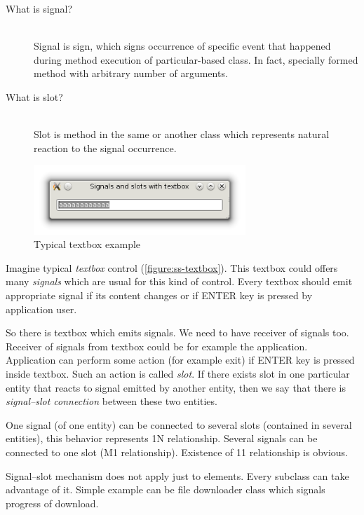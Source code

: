 \begin{description}\label{desc:sig}
\item[What is signal?] \hfill \\
Signal is sign, which signs occurrence of specific event that happened during method execution of particular-based class. In fact, specially formed method with arbitrary number of arguments.
\item[What is slot?] \hfill \\
Slot is method in the same or another class which represents natural reaction to the signal occurrence.
\end{description}

\begin{figure}[ht]
\centering
\includegraphics[width=8cm]{graphics/laboratory/14-ss-textbox.png}
\caption{Typical textbox example}\label{figure:ss-textbox}
\end{figure}

Imagine typical \textit{textbox} control (\autoref{figure:ss-textbox}). This textbox could offers many \textit{signals} which are usual for this kind of control. Every textbox should emit appropriate signal if its content changes or if ENTER key is pressed by application user.

So there is textbox which emits signals. We need to have receiver of signals too. Receiver of signals from textbox could be for example the application. Application can perform some action (for example exit) if ENTER key is pressed inside textbox. Such an action is called \textit{slot}. If there exists slot in one particular entity that reacts to signal emitted by another entity, then we say that there is \textit{signal--slot connection} between these two entities.

One signal (of one entity) can be connected to several slots (contained in several entities), this behavior represents 1\text{:}N relationship. Several signals can be connected to one slot (M\text{:}1 relationship). Existence of 1\text{:}1 relationship is obvious.

Signal--slot mechanism does not apply just to  elements. Every subclass can take advantage of it. Simple example can be file downloader class which signals progress of download.


